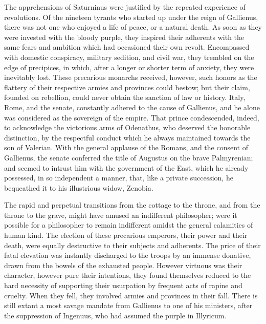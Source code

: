 The apprehensions of Saturninus were justified by the repeated
experience of revolutions. Of the nineteen tyrants who started up
under the reign of Gallienus, there was not one who enjoyed a
life of peace, or a natural death. As soon as they were invested
with the bloody purple, they inspired their adherents with the
same fears and ambition which had occasioned their own revolt.
Encompassed with domestic conspiracy, military sedition, and
civil war, they trembled on the edge of precipices, in which,
after a longer or shorter term of anxiety, they were inevitably
lost. These precarious monarchs received, however, such honors as
the flattery of their respective armies and provinces could
bestow; but their claim, founded on rebellion, could never obtain
the sanction of law or history. Italy, Rome, and the senate,
constantly adhered to the cause of Gallienus, and he alone was
considered as the sovereign of the empire. That prince
condescended, indeed, to acknowledge the victorious arms of
Odenathus, who deserved the honorable distinction, by the
respectful conduct which he always maintained towards the son of
Valerian. With the general applause of the Romans, and the
consent of Gallienus, the senate conferred the title of Augustus
on the brave Palmyrenian; and seemed to intrust him with the
government of the East, which he already possessed, in so
independent a manner, that, like a private succession, he
bequeathed it to his illustrious widow, Zenobia.\footnotemark[165]


The rapid and perpetual transitions from the cottage to the
throne, and from the throne to the grave, might have amused an
indifferent philosopher; were it possible for a philosopher to
remain indifferent amidst the general calamities of human kind.
The election of these precarious emperors, their power and their
death, were equally destructive to their subjects and adherents.
The price of their fatal elevation was instantly discharged to
the troops by an immense donative, drawn from the bowels of the
exhausted people. However virtuous was their character, however
pure their intentions, they found themselves reduced to the hard
necessity of supporting their usurpation by frequent acts of
rapine and cruelty. When they fell, they involved armies and
provinces in their fall. There is still extant a most savage
mandate from Gallienus to one of his ministers, after the
suppression of Ingenuus, who had assumed the purple in Illyricum.

